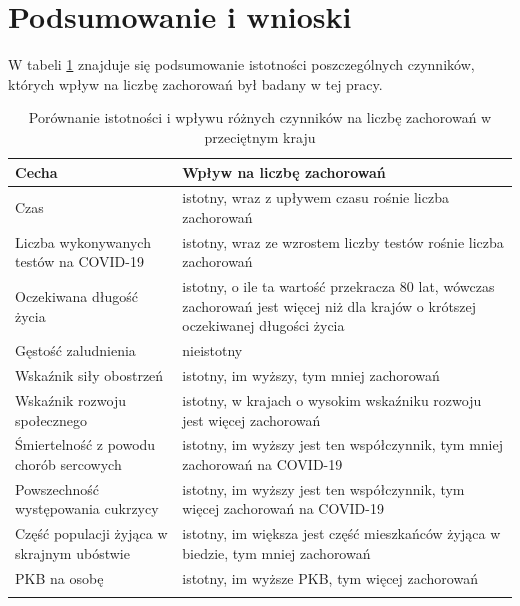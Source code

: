 \documentclass[12pt]{mwbk}
\theoremstyle{plain}
\theoremstyle{definition}
\theoremstyle{remark}
\newcommand\zrodlo[1]{\par\vspace{-3mm}{\small\textit{Źródło: }#1 }}
\begin{document}
\chapter*{Podsumowanie i wnioski}


W tabeli \ref{tab:istotnosc} znajduje się podsumowanie istotności poszczególnych czynników, których wpływ na liczbę zachorowań był badany w tej pracy.


\begin{longtable}{| p{} | p{} |}
	\hline
	Cecha & Wpływ na liczbę zachorowań \\ \hline 
	Czas & istotny, wraz z upływem czasu rośnie liczba zachorowań \\ \hline
	Liczba wykonywanych testów na COVID-19 & istotny, wraz ze wzrostem liczby testów rośnie liczba zachorowań \\ \hline
	Oczekiwana długość życia & istotny, o ile ta wartość przekracza 80 lat, wówczas zachorowań jest więcej niż dla krajów o krótszej oczekiwanej długości życia \\ \hline 
	Gęstość zaludnienia & nieistotny \\ \hline
	Wskaźnik siły obostrzeń & istotny, im wyższy, tym mniej zachorowań \\ \hline
	Wskaźnik rozwoju społecznego & istotny, w krajach o wysokim wskaźniku rozwoju jest więcej zachorowań \\ \hline
	Śmiertelność z powodu chorób sercowych & istotny, im wyższy jest ten współczynnik, tym mniej zachorowań na COVID-19 \\ \hline
	Powszechność występowania cukrzycy & istotny, im wyższy jest ten współczynnik, tym więcej zachorowań na COVID-19 \\ \hline
	Część populacji żyjąca w skrajnym ubóstwie & istotny, im większa jest część mieszkańców żyjąca w biedzie, tym mniej zachorowań \\ \hline
	PKB na osobę & istotny, im wyższe PKB, tym więcej zachorowań \\ \hline
	\caption{Porównanie istotności i wpływu różnych czynników na liczbę zachorowań w przeciętnym kraju}
	
	\label{tab:istotnosc}
	
	\end{longtable}
\begin{center}\zrodlo{Opracowanie własne}
	\end{center}
\newpage
\end{document}
